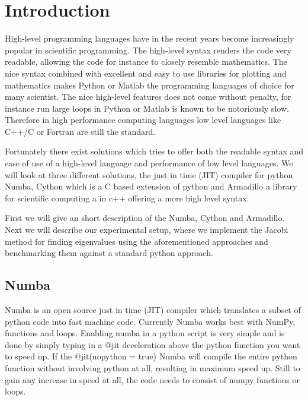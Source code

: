 \section*{Introduction}

High-level programming languages have in the recent years become increasingly
popular in scientific programming. The high-level syntax renders the code very
readable,
allowing the code for instance to closely resemble mathematics. The nice syntax
combined with excellent and easy to use libraries
for plotting and mathematics makes Python or Matlab the
programming languages of choice for many scientist.
The nice high-level features does not come without penalty, for
instance run large loops in Python or Matlab is known to be notoriously slow.
Therefore in high performance computing languages low level languages like C++/C
or Fortran are still the standard. 

Fortunately there exist solutions which tries to offer both the readable syntax
and ease of use of a high-level language and performance of low level languages.
We will
look at three different solutions, the just in time (JIT) compiler for python
Numba, Cython which is a C based extension of python and Armadillo a
library for scientific computing a in c++ offering a more high level syntax. 

First we will give an short description of the Numba, Cython and Armadillo. 
Next we will describe our experimental setup, where we implement the Jacobi
method for finding eigenvalues using the aforementioned approaches and
benchmarking them against a standard python approach.    


\subsection*{Numba}
Numba is an open source just in time (JIT) compiler which translates a subset of
python code 
into fast machine code. Currently Numba works best with NumPy, functions
and loops. Enabling numba in a python script is very simple and is done by
simply typing in a @jit deceleration above the python function you want to speed
up. If the @jit(nopython = true) Numba will compile the entire python function
without involving python at all, resulting in maximum speed up. Still to gain
any increase in speed at all, the code needs to consist of 
numpy functions or loops.   


